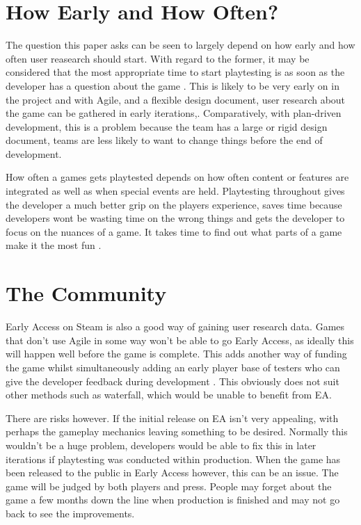 \documentclass{scrartcl}
\begin{document}
\section{How Early and How Often?}

The question this paper asks can be seen to largely depend on how early and how often user reasearch should start. With regard to the former, it may be considered that the most appropriate time to start playtesting is as soon as the developer has a question about the game \cite{GDCSharks,}. This is likely to be very early on in the project and with Agile, and a flexible design document, user research about the game can be gathered in early iterations,. Comparatively, with plan-driven development, this is a problem because the team has a large or rigid design document, teams are less likely to want to change things before the end of development. \par
How often a games gets playtested depends on how often content or features are integrated as well as when special events are held. Playtesting throughout gives the developer a much better grip on the players experience, saves time because developers wont be wasting time on the wrong things and gets the developer to focus on the nuances of a game. It takes time to find out what parts of a game make it the most fun \cite{GDCAED,}.


\section{The Community}

Early Access on Steam is also a good way of gaining user research data\cite{GamesEA,}. 
Games that don't use Agile in some way won't be able to go Early Access, as ideally this will happen well before the game is complete. This adds another way of funding the game whilst simultaneously adding an early player base of testers who can give the developer feedback during development \cite{GDCOTC,}. This obviously does not suit other methods such as waterfall, which would be unable to benefit from EA. \par
There are risks however. If the initial release on EA isn't very appealing, with perhaps the gameplay mechanics leaving something to be desired. Normally this wouldn't be a huge problem, developers would be able to fix this in later iterations if playtesting was conducted within production. When the game has been released to the public in Early Access however, this can be an issue. The game will be judged by both players and press. People may forget about the game a few months down the line when production is finished and may not go back to see the improvements.
\end{document}
